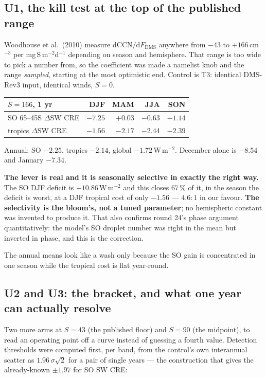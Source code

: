 \documentclass[10pt]{article}
\begin{document}
\subsection{U1, the kill test at the top of the published range}\label{sub:r26u1}
Woodhouse et al.\ (2010) measure $\mathrm{d}\mathrm{CCN}/\mathrm{d}F_{\mathrm{DMS}}$ anywhere
from $-43$ to $+166$\,cm$^{-3}$ per mg\,S\,m$^{-2}$d$^{-1}$ depending on season and
hemisphere. That range is too wide to pick a number from, so the coefficient was made a
namelist knob and the range \emph{sampled}, starting at the most optimistic end. Control is
T3: identical DMS-Rev3 input, identical winds, $S=0$.

\begin{center}\footnotesize
\begin{tabular}{l r r r r}
\toprule
$S=166$, 1 yr & DJF & MAM & JJA & SON \\
\midrule
SO 65--45S $\Delta$SW CRE & $\mathbf{-7.25}$ & $+0.03$ & $-0.63$ & $-1.14$ \\
tropics $\Delta$SW CRE & $-1.56$ & $-2.17$ & $-2.44$ & $-2.39$ \\
\bottomrule
\end{tabular}
\end{center}

\noindent Annual: SO $-2.25$, tropics $-2.14$, global $-1.72$\,W\,m$^{-2}$. December alone
is $-8.54$ and January $-7.34$.

\textbf{The lever is real and it is seasonally selective in exactly the right way.} The SO
DJF deficit is $+10.86$\,W\,m$^{-2}$ and this closes $67\,\%$ of it, in the season the
deficit is worst, at a DJF tropical cost of only $-1.56$ --- $4.6\!:\!1$ in our favour.
\textbf{The selectivity is the bloom's, not a tuned parameter}; no hemispheric constant was
invented to produce it. That also confirms round 24's phase argument quantitatively: the
model's SO droplet number was right in the mean but inverted in phase, and this is the
correction.

The annual means look like a wash only because the SO gain is concentrated in one season
while the tropical cost is flat year-round.

\subsection{U2 and U3: the bracket, and what one year can actually
resolve}\label{sub:r26bracket}
Two more arms at $S=43$ (the published floor) and $S=90$ (the midpoint), to read an
operating point off a curve instead of guessing a fourth value. Detection thresholds were
computed first, per band, from the control's own interannual scatter as
$1.96\,\sigma\sqrt{2}$ for a pair of single years --- the construction that gives the
already-known $\pm1.97$ for SO SW CRE:
\end{document}
